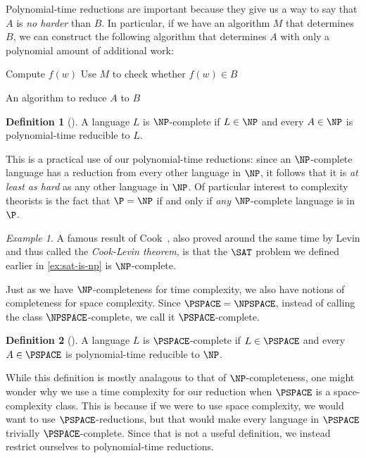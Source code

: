 \documentclass[english]{reedthesis}
\theoremstyle{plain}
\theoremstyle{definition}
\newtheorem{defn}[defn]{Definition}
\theoremstyle{remark}
\newtheorem{example}{Example}[thm]
\begin{document}
Polynomial-time reductions are important because they give us a way to say that
$A$ is \emph{no harder} than $B$. In particular, if we have an algorithm $M$
that determines $B$, we can construct the following algorithm that determines
$A$ with only a polynomial amount of additional work:

\begin{algorithm}[H]
  Compute $f(w)$\;
  Use $M$ to check whether $f(w) \in B$\;
  \;
  \caption{An algorithm to reduce $A$ to $B$}
\end{algorithm}

\begin{defn}[{\cite[Def.\ 7.34]{Sip97}}]\label{def:np-complete}
  A language $L$ is $\NP$-complete if $L \in \NP$ and every $A \in \NP$ is
  polynomial-time reducible to $L$.
\end{defn}

This is a practical use of our polynomial-time reductions: since an
$\NP$-complete language has a reduction from every other language in $\NP$, it
follows that it is \emph{at least as hard} as any other language in $\NP$. Of
particular interest to complexity theorists is the fact that $\P = \NP$ if and
only if \emph{any} $\NP$-complete language is in $\P$.

\begin{example}\label{ex:sat-is-complete}
  A famous result of Cook~\cite{Cook71}, also proved around the same time by
  Levin and thus called the \emph{Cook-Levin theorem}, is that the $\SAT$
  problem we defined earlier in \cref{ex:sat-is-np} is $\NP$-complete.
\end{example}

Just as we have $\NP$-completeness for time complexity, we also have notions of
completeness for space complexity. Since $\PSPACE = \NPSPACE$, instead of
calling the class $\NPSPACE$-complete, we call it $\PSPACE$-complete.

\begin{defn}[{\cite[Def.\ 8.8]{Sip97}}]\label{def:pspace-complete}
  A language $L$ is $\PSPACE$-complete if $L \in \PSPACE$ and every $A \in \PSPACE$
  is polynomial-time reducible to $\NP$.
\end{defn}

While this definition is mostly analagous to that of $\NP$-completeness, one
might wonder why we use a time complexity for our reduction when $\PSPACE$ is a
space-complexity class. This is because if we were to use space complexity, we
would want to use $\PSPACE$-reductions, but that would make every language in
$\PSPACE$ trivially $\PSPACE$-complete. Since that is not a useful definition,
we instead restrict ourselves to polynomial-time reductions.
\end{document}
